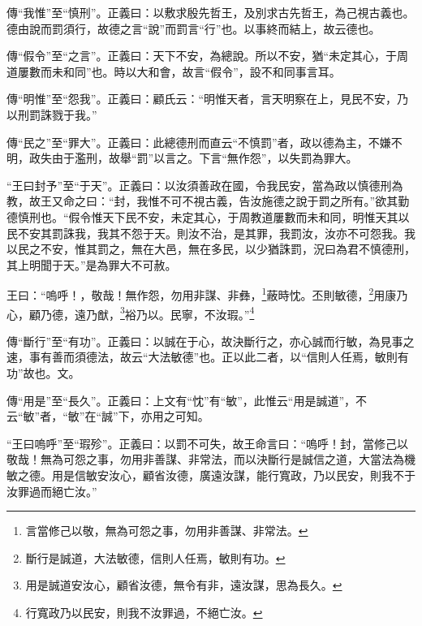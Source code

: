 {\noindent\zhuan{}\fzbyks 傳“我惟”至“慎刑”。正義曰：以敷求殷先哲王，及別求古先哲王，為己視古義也。德由說而罰須行，故德之言“說”而罰言“行”也。以事終而結上，故云德也。 \par}

{\noindent\zhuan{}\fzbyks 傳“假令”至“之言”。正義曰：天下不安，為總說。所以不安，猶“未定其心，于周道屢數而未和同”也。時以大和會，故言“假令”，設不和同事言耳。 \par}

{\noindent\zhuan{}\fzbyks 傳“明惟”至“怨我”。正義曰：顧氏云：“明惟天者，言天明察在上，見民不安，乃以刑罰誅戮于我。” \par}

{\noindent\zhuan{}\fzbyks 傳“民之”至“罪大”。正義曰：此總德刑而直云“不慎罰”者，政以德為主，不嫌不明，政失由于濫刑，故舉“罰”以言之。下言“無作怨”，以失罰為罪大。 \par}

{\noindent\shu{}\fzkt “王曰封予”至“于天”。正義曰：以汝須善政在國，令我民安，當為政以慎德刑為教，故王又命之曰：“封，我惟不可不視古義，告汝施德之說于罰之所有。”欲其勤德慎刑也。“假令惟天下民不安，未定其心，于周教道屢數而未和同，明惟天其以民不安其罰誅我，我其不怨于天。則汝不治，是其罪，我罰汝，汝亦不可怨我。我以民之不安，惟其罰之，無在大邑，無在多民，以少猶誅罰，況曰為君不慎德刑，其上明聞于天。”是為罪大不可赦。 \par}

王曰：“嗚呼！，敬哉！無作怨，勿用非謀、非彝，\footnote{言當修己以敬，無為可怨之事，勿用非善謀、非常法。}蔽時忱。丕則敏德，\footnote{斷行是誠道，大法敏德，信則人任焉，敏則有功。}用康乃心，顧乃德，遠乃猷，\footnote{用是誠道安汝心，顧省汝德，無令有非，遠汝謀，思為長久。}裕乃以。民寧，不汝瑕。”\footnote{行寬政乃以民安，則我不汝罪過，不絕亡汝。}


{\noindent\zhuan{}\fzbyks 傳“斷行”至“有功”。正義曰：以誠在于心，故決斷行之，亦心誠而行敏，為見事之速，事有善而須德法，故云“大法敏德”也。正以此二者，以“信則人任焉，敏則有功”故也。文。 \par}

{\noindent\zhuan{}\fzbyks 傳“用是”至“長久”。正義曰：上文有“忱”有“敏”，此惟云“用是誠道”，不云“敏”者，“敏”在“誠”下，亦用之可知。 \par}

{\noindent\shu{}\fzkt “王曰嗚呼”至“瑕殄”。正義曰：以罰不可失，故王命言曰：“嗚呼！封，當修己以敬哉！無為可怨之事，勿用非善謀、非常法，而以決斷行是誠信之道，大當法為機敏之德。用是信敏安汝心，顧省汝德，廣遠汝謀，能行寬政，乃以民安，則我不于汝罪過而絕亡汝。” \par}

